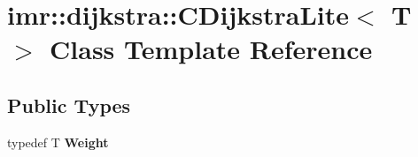 \hypertarget{classimr_1_1dijkstra_1_1CDijkstraLite}{}\section{imr\+:\+:dijkstra\+:\+:C\+Dijkstra\+Lite$<$ T $>$ Class Template Reference}
\label{classimr_1_1dijkstra_1_1CDijkstraLite}
\subsection*{Public Types}
\begin{DoxyCompactItemize}
\item 
typedef T {\bfseries Weight}\hypertarget{classimr_1_1dijkstra_1_1CDijkstraLite_a9e6728b398e7731721c4204fe6fd4c43}{}\label{classimr_1_1dijkstra_1_1CDijkstraLite_a9e6728b398e7731721c4204fe6fd4c43}

\end{DoxyCompactItemize}
